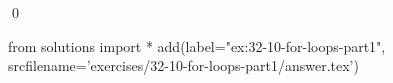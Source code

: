 
\begin{ex}
  \label{ex:32-10-for-loops-part1}
  
  \qed
\end{ex}
\begin{python0}
from solutions import *
add(label="ex:32-10-for-loops-part1",
    srcfilename='exercises/32-10-for-loops-part1/answer.tex')
\end{python0}
